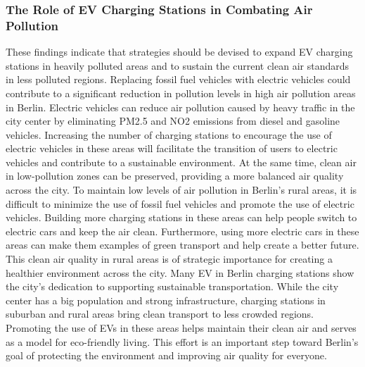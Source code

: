 \subsubsection{The Role of EV Charging Stations in Combating Air Pollution}\label{sec:43}
These findings indicate that strategies should be devised to expand EV charging stations in heavily polluted areas and to sustain the current clean air standards in less polluted regions. Replacing fossil fuel vehicles with electric vehicles could contribute to a significant reduction in pollution levels in high air pollution areas in Berlin. Electric vehicles can reduce air pollution caused by heavy traffic in the city center by eliminating PM2.5 and NO2 emissions from diesel and gasoline vehicles. Increasing the number of charging stations to encourage the use of electric vehicles in these areas will facilitate the transition of users to electric vehicles and contribute to a sustainable environment. At the same time, clean air in low-pollution zones can be preserved, providing a more balanced air quality across the city. To maintain low levels of air pollution in Berlin's rural areas, it is difficult to minimize the use of fossil fuel vehicles and promote the use of electric vehicles. Building more charging stations in these areas can help people switch to electric cars and keep the air clean. Furthermore, using more electric cars in these areas can make them examples of green transport and help create a better future. This clean air quality in rural areas is of strategic importance for creating a healthier environment across the city. Many EV in Berlin charging stations show the city's dedication to supporting sustainable transportation. While the city center has a big population and strong infrastructure, charging stations in suburban and rural areas bring clean transport to less crowded regions. Promoting the use of EVs in these areas helps maintain their clean air and serves as a model for eco-friendly living. This effort is an important step toward Berlin’s goal of protecting the environment and improving air quality for everyone.
